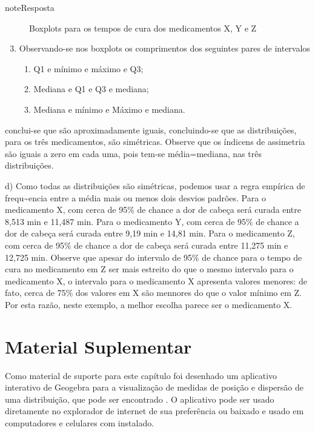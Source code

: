 \begin{sphinxadmonition}{note}{Resposta}
\begin{enumerate}
\end{enumerate}

\begin{figure}[H]
\centering
\capstart

\noindent{}
\caption{Boxplots para os tempos de cura dos medicamentos X, Y e Z}\label{\detokenize{PE104-E:id3}}\label{\detokenize{PE104-E:id16}}\end{figure}
\begin{enumerate}
\setcounter{enumi}{2}
\item {} 
Observando-se nos boxplots os comprimentos dos seguintes pares de intervalos
\begin{enumerate}
\item {} 
Q1 e mínimo e máximo e Q3;

\item {} 
Mediana e Q1 e Q3 e mediana;

\item {} 
Mediana e mínimo e Máximo e mediana.

\end{enumerate}

\end{enumerate}

conclui-se que são aproximadamente iguais, concluindo-se que as distribuições, para os três medicamentos, são simétricas. Observe que os índicens de assimetria são iguais a zero em cada uma, pois tem-se média=mediana, nas três distribuições.

d) Como todas as distribuições são simétricas, podemos usar a regra empírica de frequ\textasciitilde{}encia entre a média mais ou menos dois desvios padrões. Para o medicamento X, com cerca de 95\% de chance a dor de cabeça será curada entre 8,513 min e 11,487 min.  Para o medicamento Y, com cerca de 95\% de chance a dor de cabeça será curada entre 9,19 min e 14,81 min.
Para o medicamento Z, com cerca de 95\% de chance a dor de cabeça será curada entre 11,275 min e 12,725 min. Observe que apesar do intervalo de 95\% de chance para o tempo de cura no medicamento em Z ser mais estreito do que o mesmo intervalo para o medicamento X, o intervalo para o medicamento X apresenta valores menores: de fato, cerca de 75\% dos valores em X são mennores do que o valor mínimo em Z. Por esta razão, neste exemplo, a melhor escolha parece ser o medicamento X.
\end{sphinxadmonition}


\section{Material Suplementar}
\label{\detokenize{PE104-E:material-suplementar}}\label{\detokenize{PE104-E:sec-applet-medidas}}
Como material de suporte para este capítulo foi desenhado um aplicativo interativo de Geogebra para a visualização de medidas de posição e dispersão de uma distribuição, que pode ser encontrado . O aplicativo pode ser usado diretamente no explorador de internet de sua preferência ou baixado e usado em computadores e celulares com  instalado.

